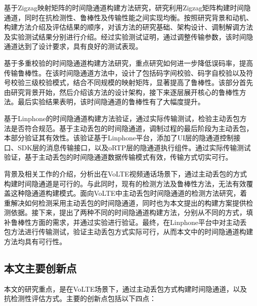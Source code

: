 基于Zigzag映射矩阵的时间隐通道构建方法研究，研究利用Zigzag矩阵构建时间隐通道，同时在抗检测性、鲁棒性及传输性能之间实现均衡。按照研究背景和动机、构建方法介绍及评估结果的顺序，对该方法的研究基础、架构设计、调制解调方法及实验测试结果分别进行介绍。经过实验测试证明，通过调整传输参数，该时间隐通道达到了设计要求，具有良好的测试表现。

基于多重校验的时间隐通道构建方法研究，重点研究如何进一步降低误码率，提高传输鲁棒性。在该时间隐通道方法中，设计了包括码字间校验、码字自校验以及符号校验三级校验模式，结合不同规模的映射矩阵，显著提高了鲁棒性。该部分首先由研究背景开始，然后介绍该方法的设计架构，接下来逐层展开核心的鲁棒性方法。最后实验结果表明，该时间隐通道的鲁棒性有了大幅度提升。

基于Linphone的时间隐通道构建方法验证，通过实际传输测试，检验主动丢包方法是否符合规范。基于主动丢包的时间隐通道，调制过程的最后阶段为主动丢包，本部分验证其有效性。该验证基于Linphone平台，添加了UI层的隐通道控制接口、SDK层的消息传输接口，以及oRTP层的隐通道执行组件。通过实际传输测试验证，基于主动丢包的时间隐通道数据传输模式有效，传输方式切实可行。

背景及相关工作的介绍，分析出在VoLTE视频通话场景下，通过主动丢包的方式构建时间隐通道是可行的。与此同时，现有的检测方法及鲁棒性方法，无法有效覆盖这种隐通道构建模式。面向VoLTE中主动丢包时间隐通道的检测方法研究，着重解决如何检测采用主动丢包的时间隐通道，同时也为本文提出的构建方案提供检测依据。接下来，提出了两种不同的时间隐通道构建方法，分别从不同的方式，填补鲁棒性方面的需求，并通过实验进行验证。最终，在Linphone平台中对主动丢包方法进行传输测试，验证主动丢包方式实际可行，从而本文中的时间隐通道构建方法均具有可行性。

\subsection{本文主要创新点}
\label{sec:intro:work:inno}

本文的研究重点，是在VoLTE场景下，通过主动丢包方式构建时间隐通道，以及抗检测性评估方式。主要的创新点包括以下四点：

